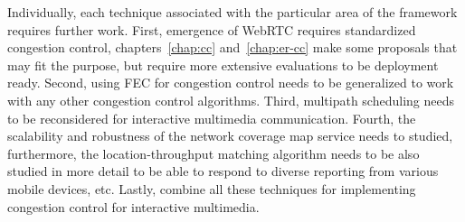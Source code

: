 Individually, each technique associated with the particular area of the
framework requires further work. First, emergence of WebRTC requires
standardized congestion control, chapters~\ref{chap:cc} and~\ref{chap:er-cc}
make some proposals that may fit the purpose, but require more extensive
evaluations to be deployment ready. Second, using FEC for congestion control
needs to be generalized to work with any other congestion control algorithms.
Third, multipath scheduling needs to be reconsidered for interactive
multimedia communication. Fourth, the scalability and robustness of the
network coverage map service needs to studied, furthermore, the 
location-throughput matching algorithm needs to be also studied in more 
detail to be able to respond to diverse reporting from various mobile 
devices, etc. Lastly, combine all these techniques for implementing 
congestion control for interactive multimedia.


